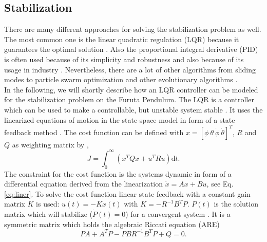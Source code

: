 \subsection{Stabilization}
There are many different approaches for solving the stabilization problem as 
well. The most common one is the linear quadratic regulation (LQR) because it 
guarantees the optimal solution \citep{hamza2019current}. Also the 
proportional integral derivative (PID) is often used because of its simplicity 
and robustness and also because of its usage in industry 
\citep{hassanzadeh2011controller}. Nevertheless, there are a lot of other 
algorithms from sliding modes \citep{izutsu2008swing} to particle swarm 
optimization and other evolutionary algorithms 
\citep{hassanzadeh2011controller}.\\
In the following, we will shortly describe how an LQR controller can be modeled 
for the stabilization problem on the Furuta Pendulum. The LQR is a controller 
which can be used to make a controllable, but unstable system stable 
\citep{park2011swing}. It uses the linearized equations of motion in the 
state-space model in form of a state feedback method \citep{ozbek2010swing}. 
The cost function can be defined with $x=[\phi \ \theta \ \dot{\phi}\ 
\dot{\theta}]^T$, $R$ and $Q$ as weighting matrix by 
\citep{al2013experimental},
\[J=\int_{0}^{\infty}\left(x^TQx+u^TRu\right)\text{d}t.\]
The constraint for the cost function is the systems dynamic in form of a 
differential equation derived from the linearization $\dot{x}=Ax+Bu$, see 
Eq. \eqref{eq:liner}. To solve 
the cost function linear state feedback with a constant gain matrix $K$ is 
used: $u(t)=-Kx(t)$ with $K=-R^{-1}B^TP$. $P(t)$ is the 
solution matrix which will stabilize ($\dot{P}(t)=0$) for a convergent system 
\citep{chen2007linear}. It 
is a symmetric matrix which holds the algebraic Riccati equation (ARE) 
\citep{al2013experimental}
\[PA+A^TP-PBR^{-1}B^TP+Q=0.\]

